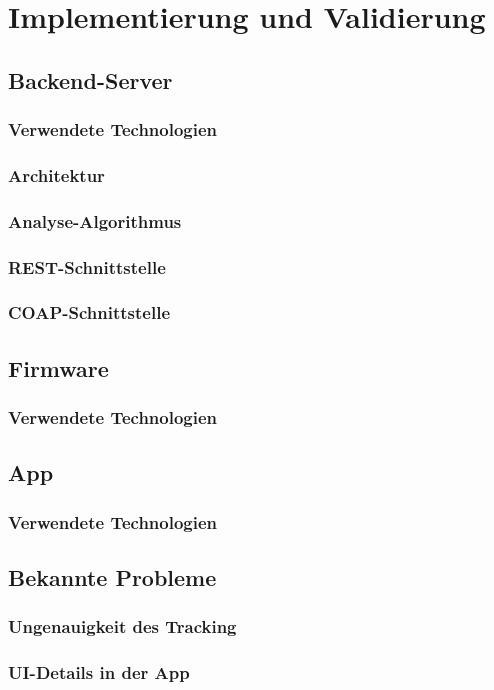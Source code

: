 \chapter{Implementierung und Validierung}

\section{Backend-Server}

\subsection{Verwendete Technologien}

\subsection{Architektur}

\subsection{Analyse-Algorithmus}

\subsection{REST-Schnittstelle}

\subsection{COAP-Schnittstelle}


\section{Firmware}

\subsection{Verwendete Technologien}


\section{App}

\subsection{Verwendete Technologien}


\section{Bekannte Probleme}
\subsection{Ungenauigkeit des Tracking}

\subsection{UI-Details in der App}
